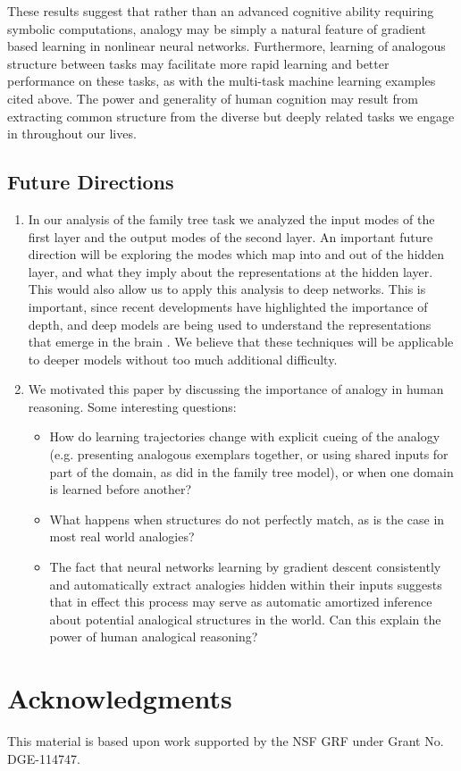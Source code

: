 \documentclass[10pt,letterpaper]{article}
\begin{document}
These results suggest that rather than an advanced cognitive ability requiring symbolic computations, analogy may be simply a natural feature of gradient based learning in nonlinear neural networks. Furthermore, learning of analogous structure between tasks may facilitate more rapid learning and better performance on these tasks, as with the multi-task machine learning examples cited above. The power and generality of human cognition may result from extracting common structure from the diverse but deeply related tasks we engage in throughout our lives. 
\subsection{Future Directions}
\begin{enumerate}
\itemsep0em
\item In our analysis of the family tree task we analyzed the input modes of the first layer and the output modes of the second layer. An important future direction will be exploring the modes which map into and out of the hidden layer, and what they imply about the representations at the hidden layer. This would also allow us to apply this analysis to deep networks. This is important, since recent developments have highlighted the importance of depth, and deep models are being used to understand the representations that emerge in the brain \citep[e.g.]{Yamins2016a}. We believe that these techniques will be applicable to deeper models without too much additional difficulty. 
\item We motivated this paper by discussing the importance of analogy in human reasoning. Some interesting questions:
\begin{itemize}
\itemsep0em
\item How do learning trajectories change with explicit cueing of the analogy (e.g. presenting analogous exemplars together, or using shared inputs for part of the domain, as \citet{Hinton1986} did in the family tree model), or when one domain is learned before another?
\item What happens when structures do not perfectly match, as is the case in most real world analogies?
\item The fact that neural networks learning by gradient descent consistently and automatically extract analogies hidden within their inputs suggests that in effect this process may serve as automatic amortized inference about potential analogical structures in the world. Can this explain the power of human analogical reasoning?  
\end{itemize}
\end{enumerate}
\section{Acknowledgments}
This material is based upon work supported by the NSF GRF under Grant No. DGE-114747.


\setlength{\bibleftmargin}{.125in}
\setlength{\bibindent}{-\bibleftmargin}


\end{document}
